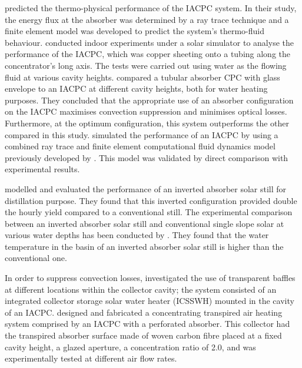 \citet{Eames1996} predicted the thermo-physical performance of the IACPC system. In their study, the energy flux at the absorber was determined by a ray trace technique and a finite element model was developed to predict the system's thermo-fluid behaviour. %
\citet{Kothdiwala1997} conducted indoor experiments under a solar simulator to analyse the performance of the IACPC, which was copper sheeting onto a tubing along the concentrator's long axis. The tests were carried out using water as the flowing fluid at various cavity heights. %
\citet{Kothdiwala1999} compared a tubular absorber CPC with glass envelope to an IACPC at different cavity heights, both for water heating purposes. They concluded that the appropriate use of an absorber configuration on the IACPC maximises convection suppression and minimises optical losses. Furthermore, at the optimum configuration, this system outperforms the other compared in this study.
\citet{Eames2001} simulated the performance of an IACPC by using a combined ray trace and finite element computational fluid dynamics model previously developed by \citet{Eames1993a}. This model was validated by direct comparison with experimental results.

\citet{Tiwari1998} modelled and evaluated the performance of an inverted absorber solar still for distillation purpose. They found that this inverted configuration provided double the hourly yield compared to a conventional still. The experimental comparison between an inverted absorber solar still and conventional single slope solar at various water depths has been conducted by \citet{Dev2011}. They found that the water temperature in
the basin of an inverted absorber solar still is higher than the conventional one. 

In order to suppress convection losses, \citet{Smyth2005} investigated the use of transparent baffles at different locations within the collector cavity; the system consisted of an integrated collector storage solar water heater (ICSSWH) mounted in the cavity of an IACPC. \citet{Shams2016} designed and fabricated a concentrating transpired air heating system comprised by an IACPC with a perforated absorber. This collector had the transpired absorber surface made of woven carbon fibre placed at a fixed cavity height, a glazed aperture, a concentration ratio of 2.0, and was experimentally tested at different air flow rates.

